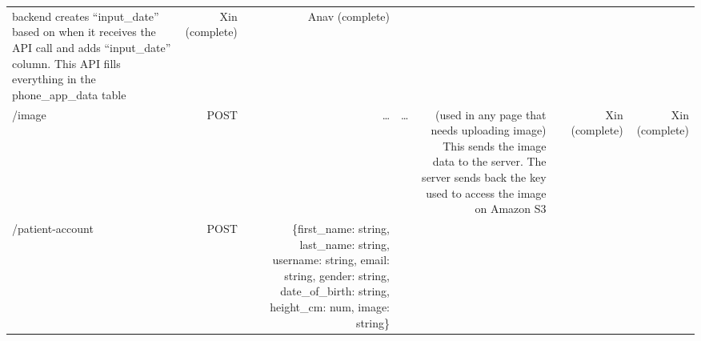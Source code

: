 \documentclass[]{book}
\begin{document}
\begin{longtable}[]{@{}lrrcrrrr@{}}
\begin{minipage}[t]{0.06\columnwidth}
backend creates ``input\_date'' based on when it receives the API call and adds ``input\_date'' column. This API fills everything in the phone\_app\_data table\strut
\end{minipage} & \begin{minipage}[t]{0.06\columnwidth}\raggedleft
Xin (complete)\strut
\end{minipage} & \begin{minipage}[t]{0.06\columnwidth}\raggedleft
Anav (complete)\strut
\end{minipage}\tabularnewline
\begin{minipage}[t]{0.13\columnwidth}\raggedright
/image\strut
\end{minipage} & \begin{minipage}[t]{0.14\columnwidth}\raggedleft
POST\strut
\end{minipage} & \begin{minipage}[t]{0.14\columnwidth}\raggedleft
\ldots{}\strut
\end{minipage} & \begin{minipage}[t]{0.15\columnwidth}\centering
\ldots{}\strut
\end{minipage} & \begin{minipage}[t]{0.06\columnwidth}\raggedleft
(used in any page that needs uploading image) This sends the image data to the server. The server sends back the key used to access the image on Amazon S3\strut
\end{minipage} & \begin{minipage}[t]{0.06\columnwidth}\raggedleft
\strut
\end{minipage} & \begin{minipage}[t]{0.06\columnwidth}\raggedleft
Xin (complete)\strut
\end{minipage} & \begin{minipage}[t]{0.06\columnwidth}\raggedleft
Xin (complete)\strut
\end{minipage}\tabularnewline
\begin{minipage}[t]{0.13\columnwidth}\raggedright
/patient-account\strut
\end{minipage} & \begin{minipage}[t]{0.14\columnwidth}\raggedleft
POST\strut
\end{minipage} & \begin{minipage}[t]{0.14\columnwidth}\raggedleft
\{first\_name: string, last\_name: string, username: string, email: string, gender: string, date\_of\_birth: string, height\_cm: num, image: string\}\strut
\end{minipage} & \begin{minipage}[t]{0.15\columnwidth}\centering

\end{minipage}
\end{longtable}
\end{document}
